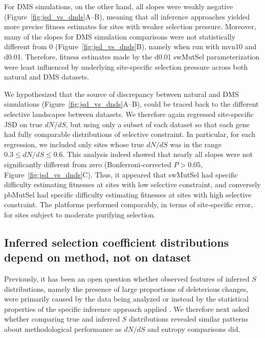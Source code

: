 \documentclass[11pt]{article}
\begin{document}
For DMS simulations, on the other hand, all slopes were weakly negative (Figure~\ref{fig:jsd_vs_dnds}A--B), meaning that all inference approaches yielded more precise fitness estimates for sites with weaker selection pressure. Moreover, many of the slopes for DMS simulation comparisons were not statistically different from 0 (Figure~\ref{fig:jsd_vs_dnds}B), namely when run with mvn10 and d0.01. Therefore, fitness estimates made by the d0.01 swMutSel parameterization were least influenced by underlying site-specific selection pressure across both natural and DMS datasets.

We hypothesized that the source of discrepancy between natural and DMS simulations (Figure~\ref{fig:jsd_vs_dnds}A--B), could be traced back to the different selective landscapes between datasets. We therefore again regressed site-specific JSD on true $dN/dS$, but using only a subset of each dataset so that each gene had fully comparable distributions of selective constraint. In particular, for each regression, we included only sites whose true $dN/dS$ was in the range $0.3\leq dN/dS\leq0.6$. This analysis indeed showed that nearly all slopes were not significantly different from zero (Bonferroni-corrected $P>0.05$, Figure~\ref{fig:jsd_vs_dnds}C). Thus, it appeared that swMutSel had specific difficulty estimating fitnesses at sites with low selective constraint, and conversely pbMutSel had specific difficulty estimating fitnesses at sites with high selective constraint. The platforms performed comparably, in terms of site-specific error, for sites subject to moderate purifying selection.




\subsection*{Inferred selection coefficient distributions depend on method, not on dataset}

Previously, it has been an open question whether observed features of inferred $S$ distributions, namely the presence of large proportions of deleterious changes, were primarily caused by the data being analyzed or instead by the statistical properties of the specific inference approach applied \citep{Rodrigue2013}.
We therefore next asked whether comparing true and inferred $S$ distributions revealed similar patterns about methodological performance as $dN/dS$ and entropy comparisons did.
\end{document}
